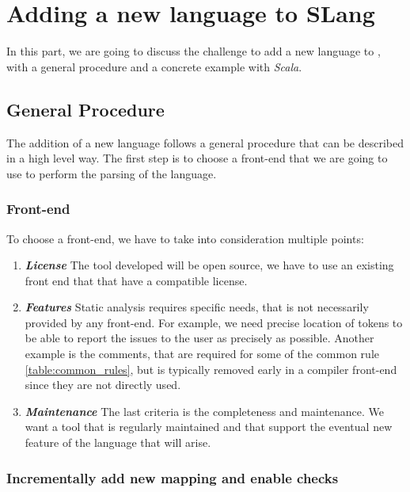 \section{Adding a new language to SLang}
\label{sec:new_language}

In this part, we are going to discuss the challenge to add a new language to \slang{}, with a general procedure and a concrete example with \emph{Scala}.

\subsection{General Procedure}
\label{subsec:general_procedure}

The addition of a new language follows a general procedure that can be described in a high level way.
The first step is to choose a front-end that we are going to use to perform the parsing of the language.

\subsubsection{Front-end}
\label{subsubsec:front_end}

To choose a front-end, we have to take into consideration multiple points:
\begin{enumerate}
	\item \textbf{\textit{License}} \newline The tool developed will be open source, we have to use an existing front end that that have a compatible license.
	\item \textbf{\textit{Features}} \newline Static analysis requires specific needs, that is not necessarily provided by any front-end. 	For example, we need precise location of tokens to be able to report the issues to the user as precisely as possible. Another example is the comments, that are required for some of the common rule \ref{table:common_rules}, but is typically removed early in a compiler front-end since they are not directly used.
	\item \textbf{\textit{Maintenance}} \newline 
	The last criteria is the completeness and maintenance. We want a tool that is regularly maintained and that support the eventual new feature of the language that will arise. 
\end{enumerate}

\subsubsection{Incrementally add new mapping and enable checks}
\label{subsubsec:new_mapping_and_enables_rules}

